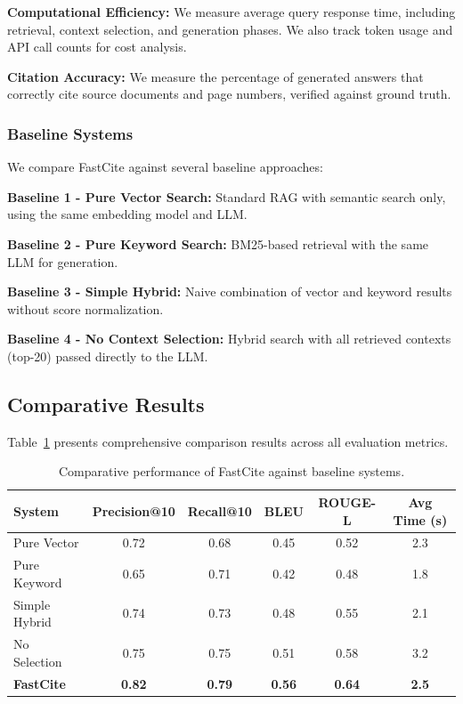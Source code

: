 \documentclass[runningheads]{llncs}
\begin{document}
\textbf{Computational Efficiency:} We measure average query response time, including retrieval, context selection, and generation phases. We also track token usage and API call counts for cost analysis.

\textbf{Citation Accuracy:} We measure the percentage of generated answers that correctly cite source documents and page numbers, verified against ground truth.

\subsubsection{Baseline Systems}

We compare FastCite against several baseline approaches:

\textbf{Baseline 1 - Pure Vector Search:} Standard RAG with semantic search only, using the same embedding model and LLM.

\textbf{Baseline 2 - Pure Keyword Search:} BM25-based retrieval with the same LLM for generation.

\textbf{Baseline 3 - Simple Hybrid:} Naive combination of vector and keyword results without score normalization.

\textbf{Baseline 4 - No Context Selection:} Hybrid search with all retrieved contexts (top-20) passed directly to the LLM.

\subsection{Comparative Results}

Table~\ref{tab:comparison} presents comprehensive comparison results across all evaluation metrics.

\begin{table}
\caption{Comparative performance of FastCite against baseline systems.}
\label{tab:comparison}
\begin{tabular}{|l|c|c|c|c|c|}
\hline
\textbf{System} & \textbf{Precision@10} & \textbf{Recall@10} & \textbf{BLEU} & \textbf{ROUGE-L} & \textbf{Avg Time (s)} \\
\hline
Pure Vector & 0.72 & 0.68 & 0.45 & 0.52 & 2.3 \\
Pure Keyword & 0.65 & 0.71 & 0.42 & 0.48 & 1.8 \\
Simple Hybrid & 0.74 & 0.73 & 0.48 & 0.55 & 2.1 \\
No Selection & 0.75 & 0.75 & 0.51 & 0.58 & 3.2 \\
\textbf{FastCite} & \textbf{0.82} & \textbf{0.79} & \textbf{0.56} & \textbf{0.64} & \textbf{2.5} \\
\hline
\end{tabular}
\end{table}
\end{document}
